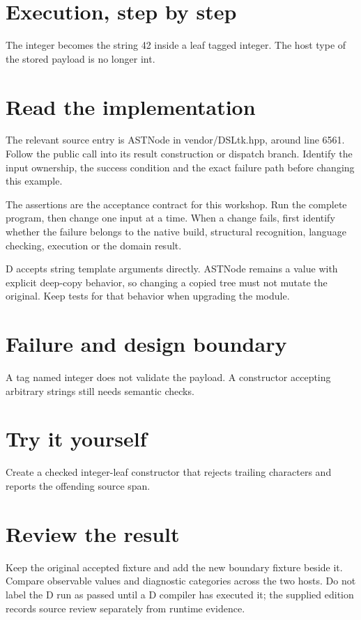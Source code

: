 
\section*{Execution, step by step}
The integer becomes the string 42 inside a leaf tagged integer. The host type of the stored payload is no longer int.

\section*{Read the implementation}
The relevant source entry is ASTNode in vendor/DSLtk.hpp, around line 6561. Follow the public call into its result construction or dispatch branch. Identify the input ownership, the success condition and the exact failure path before changing this example.

The assertions are the acceptance contract for this workshop. Run the complete program, then change one input at a time. When a change fails, first identify whether the failure belongs to the native build, structural recognition, language checking, execution or the domain result.

\clearpage
{}
D accepts string template arguments directly. ASTNode remains a value with explicit deep-copy behavior, so changing a copied tree must not mutate the original. Keep tests for that behavior when upgrading the module.


\section*{Failure and design boundary}
A tag named integer does not validate the payload. A constructor accepting arbitrary strings still needs semantic checks.

\section*{Try it yourself}
Create a checked integer-leaf constructor that rejects trailing characters and reports the offending source span.

\section*{Review the result}
Keep the original accepted fixture and add the new boundary fixture beside it. Compare observable values and diagnostic categories across the two hosts. Do not label the D run as passed until a D compiler has executed it; the supplied edition records source review separately from runtime evidence.

